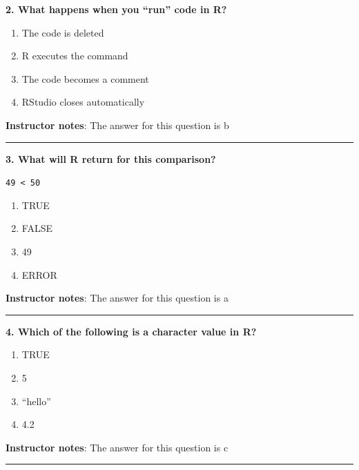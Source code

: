 \documentclass[
  letterpaper,
  DIV=11,
  numbers=noendperiod]{scrartcl}
\providecommand{\tightlist}{%
  \setlength{\itemsep}{0pt}\setlength{\parskip}{0pt}}
\begin{document}
\textbf{2. What happens when you ``run'' code in R?}

\begin{enumerate}
\def\labelenumi{\alph{enumi}.}
\tightlist
\item
  The code is deleted\\
\item
  R executes the command\\
\item
  The code becomes a comment\\
\item
  RStudio closes automatically
\end{enumerate}

\textbf{Instructor notes}: The answer for this question is b

\begin{center}\rule{0.5\linewidth}{0.5pt}\end{center}

\textbf{3. What will R return for this comparison?}

\texttt{49\ \textless{}\ 50}

\begin{enumerate}
\def\labelenumi{\alph{enumi}.}
\tightlist
\item
  TRUE
\item
  FALSE
\item
  49
\item
  ERROR
\end{enumerate}

\textbf{Instructor notes}: The answer for this question is a

\begin{center}\rule{0.5\linewidth}{0.5pt}\end{center}

\textbf{4. Which of the following is a character value in R?}

\begin{enumerate}
\def\labelenumi{\alph{enumi}.}
\tightlist
\item
  TRUE
\item
  5
\item
  ``hello''
\item
  4.2
\end{enumerate}

\textbf{Instructor notes}: The answer for this question is c

\begin{center}\rule{0.5\linewidth}{0.5pt}\end{center}
\end{document}
